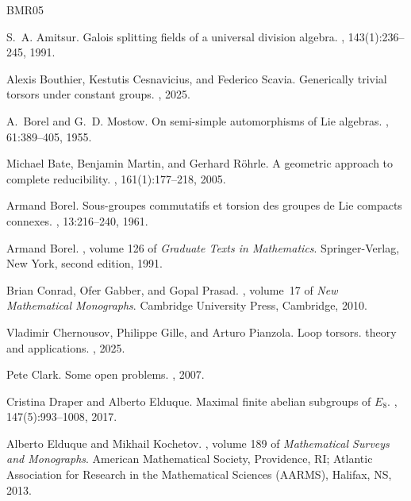 \begin{thebibliography}{BMR05}

S.~A. Amitsur.
\newblock Galois splitting fields of a universal division algebra.
, 143(1):236--245, 1991.

Alexis Bouthier, Kestutis Cesnavicius, and Federico Scavia.
\newblock Generically trivial torsors under constant groups.
, 2025.

A.~Borel and G.~D. Mostow.
\newblock On semi-simple automorphisms of {L}ie algebras.
, 61:389--405, 1955.

Michael Bate, Benjamin Martin, and Gerhard R\"ohrle.
\newblock A geometric approach to complete reducibility.
, 161(1):177--218, 2005.

Armand Borel.
\newblock Sous-groupes commutatifs et torsion des groupes de {L}ie compacts connexes.
, 13:216--240, 1961.

Armand Borel.
, volume 126 of {\em Graduate Texts in Mathematics}.
\newblock Springer-Verlag, New York, second edition, 1991.

Brian Conrad, Ofer Gabber, and Gopal Prasad.
, volume~17 of {\em New Mathematical Monographs}.
\newblock Cambridge University Press, Cambridge, 2010.

Vladimir Chernousov, Philippe Gille, and Arturo Pianzola.
\newblock Loop torsors. theory and applications.
, 2025.

Pete Clark.
\newblock Some open problems.
, 2007.

Cristina Draper and Alberto Elduque.
\newblock Maximal finite abelian subgroups of {$E_8$}.
, 147(5):993--1008, 2017.

Alberto Elduque and Mikhail Kochetov.
, volume 189 of {\em Mathematical Surveys and Monographs}.
\newblock American Mathematical Society, Providence, RI; Atlantic Association for Research in the Mathematical Sciences (AARMS), Halifax, NS, 2013.


\end{thebibliography}
